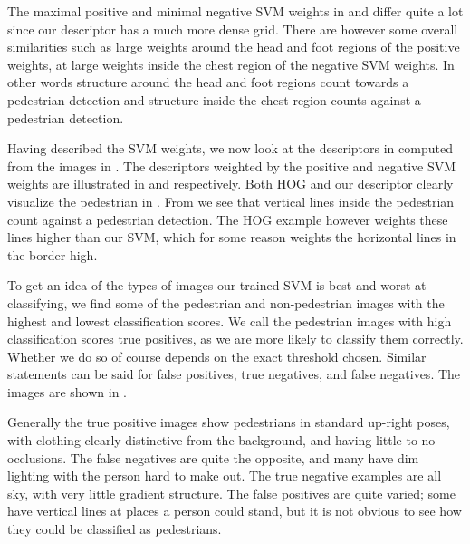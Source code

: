 \documentclass[thesis.tex]{subfiles}
\begin{document}
The maximal positive and minimal negative SVM weights in  and  differ quite a lot since our descriptor has a much more dense grid. There are however some overall similarities such as large weights around the head and foot regions of the positive weights, at large weights inside the chest region of the negative SVM weights. In other words structure around the head and foot regions count towards a pedestrian detection and structure inside the chest region counts against a pedestrian detection.

Having described the SVM weights, we now look at the descriptors in  computed from the images in . The descriptors weighted by the positive and negative SVM weights are illustrated in  and  respectively. Both HOG and our descriptor clearly visualize the pedestrian in . From  we see that vertical lines inside the pedestrian count against a pedestrian detection. The HOG example however weights these lines higher than our SVM, which for some reason weights the horizontal lines in the border high.

To get an idea of the types of images our trained SVM is best and worst at classifying, we find some of the pedestrian and non-pedestrian images with the highest and lowest classification scores. We call the pedestrian images with high classification scores true positives, as we are more likely to classify them correctly. Whether we do so of course depends on the exact threshold chosen. Similar statements can be said for false positives, true negatives, and false negatives. The images are shown in .

Generally the true positive images show pedestrians in standard up-right poses, with clothing clearly distinctive from the background, and having little to no occlusions. The false negatives are quite the opposite, and many have dim lighting with the person hard to make out. The true negative examples are all sky, with very little gradient structure. The false positives are quite varied; some have vertical lines at places a person could stand, but it is not obvious to see how they could be classified as pedestrians.
\end{document}
